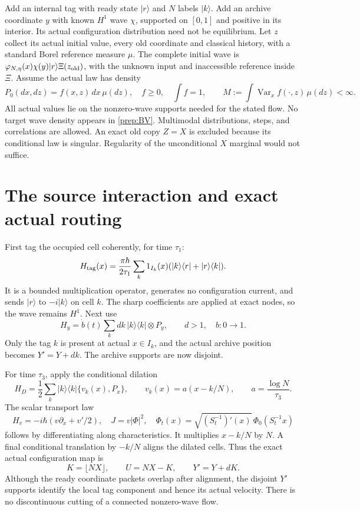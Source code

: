 \documentclass[11pt,oneside,openany]{book}
\theoremstyle{definition}
\theoremstyle{remark}\newtheorem{remark}[theorem]{Remark}
\begin{document}
Add an internal tag with ready state $|r\rangle$ and $N$ labels
$|k\rangle$. Add an archive coordinate $y$ with known $H^1$ wave
$\chi$, supported on $[0,1]$ and positive in its interior.
Its actual configuration distribution need not be equilibrium.
Let $z$ collect its actual initial value, every old coordinate and
classical history, with a standard Borel reference measure $\mu$.
The complete initial wave is
$\varphi_{N,\eta}(x)\chi(y)|r\rangle\Xi(z_{\rm old})$,
with the unknown input and inaccessible reference inside $\Xi$.
Assume the actual law has density
\begin{equation}
 P_0(dx,dz)=f(x,z)\,dx\,\mu(dz),\quad f\ge0,\quad \int f=1,
 \qquad
 M:=\int\operatorname{Var}_x f(\cdot,z)\,\mu(dz)<\infty.
 \label{prep:BV}
\end{equation}
All actual values lie on the nonzero-wave supports needed for the stated
flow. No target wave density appears in \eqref{prep:BV}.
Multimodal distributions, steps, and correlations are allowed. An exact
old copy $Z=X$ is excluded because its conditional law is singular.
Regularity of the unconditional $X$ marginal would not suffice.

\section{The source interaction and exact actual routing}

First tag the occupied cell coherently, for time $\tau_1$:
\[
 H_{\rm tag}(x)=\frac{\pi\hbar}{2\tau_1}
       \sum_k1_{I_k}(x)(|k\rangle\langle r|+|r\rangle\langle k|).
\]
It is a bounded multiplication operator, generates no configuration current,
and sends $|r\rangle$ to $-i|k\rangle$ on cell $k$.
The sharp coefficients are applied at exact nodes, so the wave remains
$H^1$. Next use
\[
 H_y=\dot b(t)\sum_k dk\,|k\rangle\langle k|\otimes P_y,
 \qquad d>1,\quad b:0\longrightarrow1.
\]
Only the tag $k$ is present at actual $x\in I_k$, and the actual archive
position becomes $Y'=Y+dk$. The archive supports are now disjoint.

For time $\tau_3$, apply the conditional dilation
\[
 H_D=\frac12\sum_k|k\rangle\langle k|\{v_k(x),P_x\},
 \qquad v_k(x)=a(x-k/N),\qquad a=\frac{\log N}{\tau_3}.
\]
The scalar transport law
\begin{equation}
 H_v=-i\hbar(v\partial_x+v'/2),\quad J=v|\Phi|^2,\quad
 \Phi_t(x)=\sqrt{(S_t^{-1})'(x)}\,\Phi_0(S_t^{-1}x)
 \label{prep:halfdensity}
\end{equation}
follows by differentiating along characteristics. It multiplies
$x-k/N$ by $N$. A final conditional translation by $-k/N$ aligns the
dilated cells. Thus the exact actual configuration map is
\begin{equation}
 K=\lfloor NX\rfloor,\qquad U=NX-K,\qquad Y'=Y+dK.
 \label{prep:map}
\end{equation}
Although the ready coordinate packets overlap after alignment, the disjoint
$Y'$ supports identify the local tag component and hence its actual velocity.
There is no discontinuous cutting of a connected nonzero-wave flow.
\end{document}
